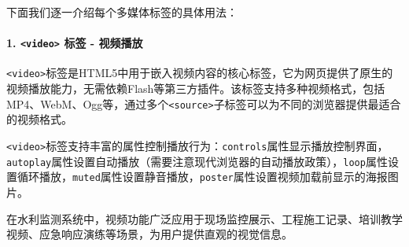 下面我们逐一介绍每个多媒体标签的具体用法：

\paragraph{\texorpdfstring{1. \texttt{\textless{}video\textgreater{}} 标签 - 视频播放}{1. \textless video\textgreater{} 标签 - 视频播放}}\label{video-ux6807ux7b7e---ux89c6ux9891ux64adux653e}

\texttt{\textless{}video\textgreater{}}标签是HTML5中用于嵌入视频内容的核心标签，它为网页提供了原生的视频播放能力，无需依赖Flash等第三方插件。该标签支持多种视频格式，包括MP4、WebM、Ogg等，通过多个\texttt{\textless{}source\textgreater{}}子标签可以为不同的浏览器提供最适合的视频格式。

\texttt{\textless{}video\textgreater{}}标签支持丰富的属性控制播放行为：\texttt{controls}属性显示播放控制界面，\texttt{autoplay}属性设置自动播放（需要注意现代浏览器的自动播放政策），\texttt{loop}属性设置循环播放，\texttt{muted}属性设置静音播放，\texttt{poster}属性设置视频加载前显示的海报图片。

在水利监测系统中，视频功能广泛应用于现场监控展示、工程施工记录、培训教学视频、应急响应演练等场景，为用户提供直观的视觉信息。

